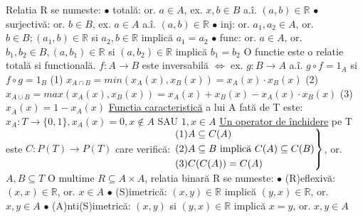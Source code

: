 \documentclass[8pt,twocolumn]{extarticle}
\begin{document}
	\noindent Relatia R se numeste: \newline
	$\bullet$ totală: or. $a \in A$, ex. $x, b \in B$ a.î. $(a, b) \in \mathbb{R}$ \newline
	$\bullet$ surjectivă: or. $b \in B$, ex. $a \in A$ a.î. $(a, b) \in \mathbb{R}$ \newline
	$\bullet$ inj: or. $a_{1}, a_{2} \in A$, or. $b \in B; (a_{1}, b) \in \mathbb{R}$ si ${a_{2}, b} \in \mathbb{R}$ implică $a_{1} = a_{2}$ \newline
	$\bullet$ func: or. $a \in A$, or. $b_{1}, b_{2} \in B, (a, b_{1}) \in \mathbb{R}$ si $(a, b_{2}) \in \mathbb{R}$ implică $b_{1} = b_{2}$ \newline
	O functie este o relatie totală si functională. \newline
	$f: A \rightarrow B$ este inversabilă $\Leftrightarrow$ ex. $g: B \rightarrow A$ a.î. $g \circ f = 1_{A}$ si $f \circ g = 1_{B}$ \newline
	(1) $x_{A \cap B} = min(x_{A}(x), x_{B}(x)) = x_{A}(x) \cdot x_{B}(x)$ \newline
	(2) $x_{A \cup B} = max(x_{A}(x), x_{B}(x)) = x_{A}(x) + x_{B}(x) - x_{A}(x) \cdot x_{B}(x)$ \newline
	(3) $x_{\overline{A}}(x) = 1 - x_{A}(x)$ \newline
	\underline{Functia caracteristică} a lui A fată de T este: \newline
	$x_{A}: T \rightarrow \{ 0, 1 \}, x_{A}(x) = 0, x \notin A$ SAU $1, x \in A$ \newline
	\underline{Un operator de închidere} pe T este $C: P(T) \rightarrow P(T)$ care verifică: \newline
	$\begin{rcases*}
		(1) A \subseteq C(A) \\
		(2) A \subseteq B\text{ implică }C(A) \subseteq C(B) \\
		(3) C(C(A)) = C(A)
	\end{rcases*}$, or. $A, B \subseteq T$ \newline
	O multime $R \subseteq A \times A$, relatia binară R se numeste: \newline
	$\bullet$ (R)eflexivă: $(x, x) \in \mathbb{R}$, or. $x \in A$ \newline
	$\bullet$ (S)imetrică: $(x, y) \in \mathbb{R}$ implică $(y, x) \in \mathbb{R}$, or. $x, y \in A$ \newline
	$\bullet$ (A)nti(S)imetrică: $(x, y)$ si $(y, x) \in \mathbb{R}$ implică $x = y$, or. $x, y \in A$ \newline
\end{document}

